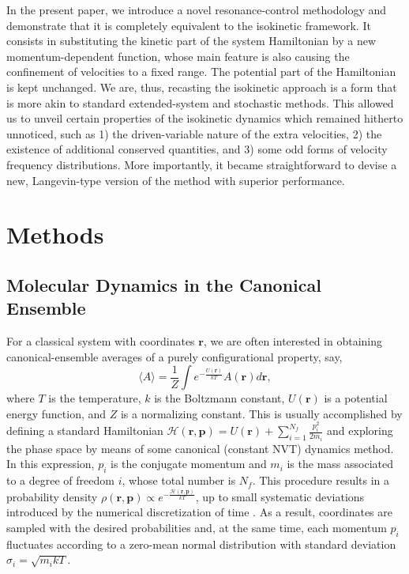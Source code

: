 \documentclass[
aip,
jcp,
reprint,
]{revtex4-1}
\newcommand{\vt}[1]{\boldsymbol{\mathbf{#1}}}          %
\begin{document}
In the present paper, we introduce a novel resonance-control methodology and demonstrate that it is completely equivalent to the isokinetic framework.
It consists in substituting the kinetic part of the system Hamiltonian by a new momentum-dependent function, whose main feature is also causing the confinement of velocities to a fixed range.
The potential part of the Hamiltonian is kept unchanged.
We are, thus, recasting the isokinetic approach is a form that is more akin to standard extended-system and stochastic methods.
This allowed us to unveil certain properties of the isokinetic dynamics which remained hitherto unnoticed, such as 1) the driven-variable nature of the extra velocities, 2) the existence of additional conserved quantities, and 3) some odd forms of velocity frequency distributions.
More importantly, it became straightforward to devise a new, Langevin-type version of the method with superior performance.

\section{Methods}
\label{sec:methods}

\subsection{Molecular Dynamics in the Canonical Ensemble}
\label{sec:standard canonical ensemble}

For a classical system with coordinates $\vt r$, we are often interested in obtaining canonical-ensemble averages of a purely configurational property, say,
\begin{equation*}
\label{eq:configurational average}
\langle A \rangle = \frac{1}{Z} \int e^{-\frac{U(\vt r)}{kT}} A(\vt r) d\vt r,
\end{equation*}
where $T$ is the temperature, $k$ is the Boltzmann constant, $U(\vt r)$ is a potential energy function, and $Z$ is a normalizing constant.
This is usually accomplished by defining a standard Hamiltonian $\mathcal{H}(\vt r, \vt p) = U(\vt r) + \sum_{i=1}^{N_f} \frac{p_i^2}{2 m_i}$ and exploring the phase space by means of some canonical (constant NVT) dynamics method.
In this expression, $p_i$ is the conjugate momentum and $m_i$ is the mass associated to a degree of freedom $i$, whose total number is $N_f$.
This procedure results in a probability density $\rho(\vt r, \vt p) \propto e^{-\frac{\mathcal{H}(\vt r, \vt p)}{kT}}$, up to small systematic deviations introduced by the numerical discretization of time \cite{Eastwood_2010, Davidchack_2010, Silveira_2017a, Silveira_2019a}.
As a result, coordinates are sampled with the desired probabilities and, at the same time, each momentum $p_i$ fluctuates according to a zero-mean normal distribution with standard deviation $\sigma_i = \sqrt{m_i k T}$.
\end{document}
